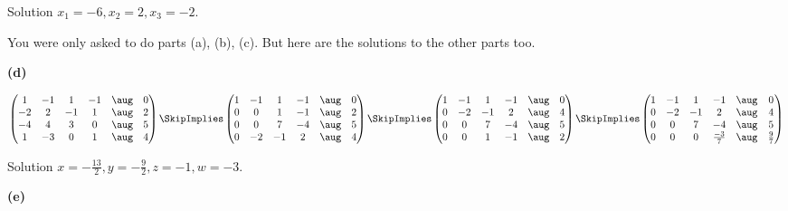 \documentclass[oneside,12pt]{amsart}
\begin{document}
\bigskip

Solution $x_1=-6, x_2=2, x_3=-2$.


You were only asked to do parts (a), (b), (c). But here are the solutions
to the other parts too.

\textbf{(d)}

\bigskip

$
\begin{pmatrix}
1 & -1 & 1 & -1 & \aug &  0 \\
-2 & 2 & -1 & 1 & \aug &  2 \\
-4 & 4 & 3 & 0 &  \aug &  5 \\
1 & -3 & 0 & 1 &  \aug &  4
\end{pmatrix}
\SkipImplies
\begin{pmatrix}
1 & -1 & 1 & -1 &  \aug & 0 \\
0 & 0 & 1 & -1 &   \aug & 2 \\
0 & 0 & 7 & -4 &   \aug & 5 \\
0 & -2 & -1 & 2 &  \aug & 4
\end{pmatrix}
\SkipImplies
\begin{pmatrix}
1 & -1 & 1 & -1 &  \aug & 0 \\
0 & -2 & -1 & 2 &  \aug & 4 \\
0 & 0 & 7 & -4 &   \aug & 5 \\
0 & 0 & 1 & -1 &   \aug & 2 \\
\end{pmatrix}
\SkipImplies
\begin{pmatrix}
1 & -1 & 1 & -1 &           \aug & 0 \\
0 & -2 & -1 & 2 &           \aug & 4 \\
0 & 0 & 7 & -4 &            \aug & 5 \\
0 & 0 & 0 & \frac{-3}{7} &  \aug & \frac{9}{7}
\end{pmatrix}
$

\bigskip

Solution $x=-\frac{13}{2}, y=-\frac{9}{2}, z = -1, w = -3$.


\textbf{(e)}

\bigskip
\end{document}
